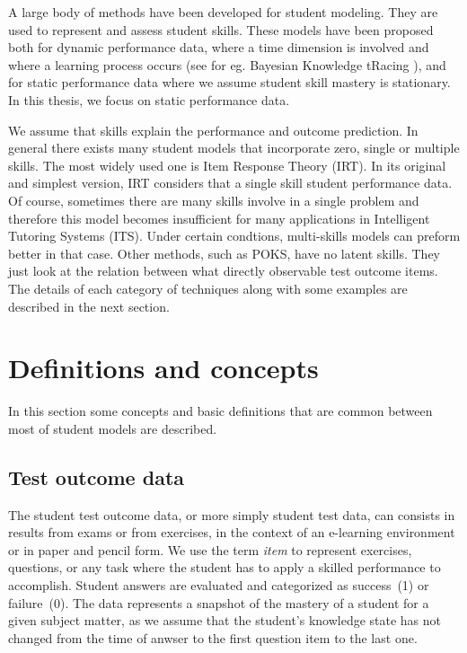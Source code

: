\label{sec:RevLitt}

A large body of methods have been developed for student modeling.  They are used to represent and assess student skills. These models have been proposed both for dynamic performance data, where a time dimension is involved and where a learning process occurs (see for eg. Bayesian Knowledge tRacing \citet{Koedinger2011}), and for static performance data where we assume student skill mastery is stationary.  In this thesis, we focus on static performance data.

We assume that skills explain the performance and outcome prediction. In general there exists many student models that incorporate zero, single or multiple skills. The most widely used one is Item Response Theory (IRT).  In its original and simplest version, IRT considers that a single skill student performance data. Of course, sometimes there are many skills involve in a single problem and therefore this model becomes insufficient for many applications in Intelligent Tutoring Systems (ITS). Under certain condtions, multi-skills models can preform better in that case. Other methods, such as POKS, have no latent skills. They just look at the relation between what directly observable test outcome items. The details of each category of techniques along with some examples are described in the next section.

\section{Definitions and concepts}

In this section some concepts and basic definitions that are common between most of student models are described. 
 
\subsection{Test outcome data}

The student test outcome data, or more simply student test data, can consists in results from exams or from exercises, in the context of an e-learning environment or in paper and pencil form.  We use the term \textit{item} to represent exercises, questions, or any task where the student has to apply a skilled performance to accomplish.  Student answers are evaluated and categorized as success~(1) or failure~(0).  The data represents a snapshot of the mastery of a student for a given subject matter, as we assume that the student's knowledge state has not changed from the time of anwser to the first question item to the last one.

